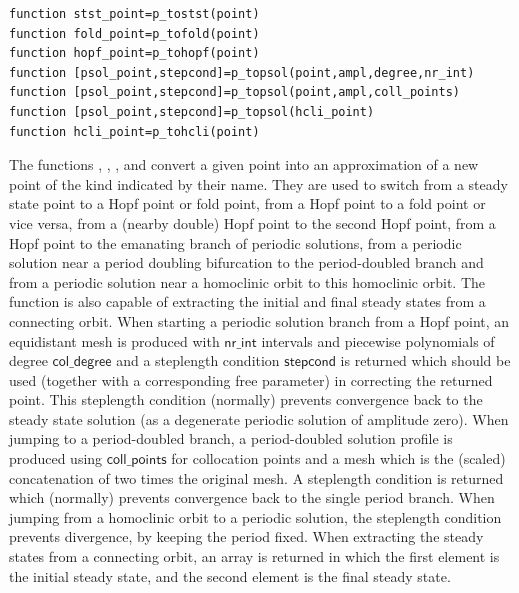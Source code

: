 \documentclass[10pt]{article}
\gdef \file#1{{\bfseries{\ttfamily{#1}}}}
\gdef \parm#1{{\mathsf{#1}}}
\begin{document}
{{\small\begin{verbatim}
function stst_point=p_tostst(point)
function fold_point=p_tofold(point)
function hopf_point=p_tohopf(point)
function [psol_point,stepcond]=p_topsol(point,ampl,degree,nr_int)
function [psol_point,stepcond]=p_topsol(point,ampl,coll_points)
function [psol_point,stepcond]=p_topsol(hcli_point)
function hcli_point=p_tohcli(point)
\end{verbatim}}
\noindent The functions \file{p\_tostst}, \file{p\_tofold}, \file{p\_tohopf},
\file{p\_topsol} and \file{p\_tohcli} convert a given point into 
an approximation of
a new point of the kind 
indicated by their name. They are used to switch from a steady state
point to a Hopf point or fold point, from a Hopf point to a fold point
or vice versa, from a (nearby double) Hopf point to the second Hopf
point, from a Hopf point to the emanating branch of periodic
solutions, from a periodic solution 
near a period doubling bifurcation to the period-doubled branch and from a 
periodic solution near a homoclinic orbit to this homoclinic orbit.  The 
function  \file{p\_tostst} is also capable of extracting the initial and 
final steady states from a connecting orbit.
When starting a periodic solution branch from a Hopf point, 
an equidistant mesh is produced 
with $\parm{nr\_int}$ intervals and piecewise polynomials of 
degree $\parm{col\_degree}$ and a steplength condition 
$\parm{stepcond}$ is returned which should be used 
(together with a corresponding free parameter) in correcting 
the returned point. This steplength condition (normally) prevents convergence
back to the steady state solution (as a degenerate periodic solution of amplitude
zero). When jumping to a period-doubled branch, a period-doubled solution
profile is produced using $\parm{coll\_points}$ for collocation points
and a mesh which is the (scaled) concatenation of two times the original mesh.
A steplength condition is returned which (normally) prevents convergence
back to the single period branch.
When jumping from a homoclinic orbit to a periodic solution, the steplength
condition prevents divergence, by keeping the period fixed.
When extracting the steady states from a connecting orbit, an array is returned
in which the first element is the initial steady state, and the second element
is the final steady state.

}
\end{document}
